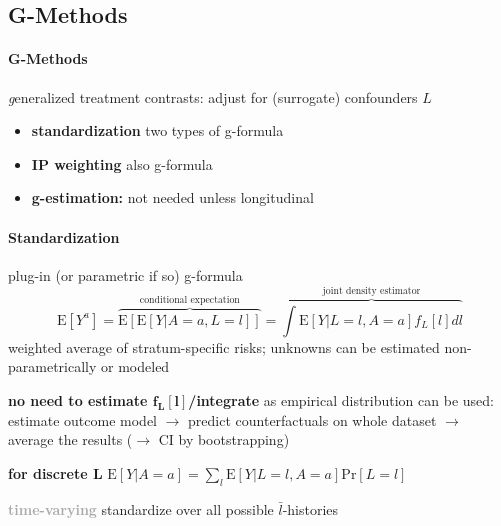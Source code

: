 \documentclass[8pt,oneside]{extarticle}
\begin{document}
\subsection{G-Methods}
\begin{multicols}{2}


\paragraph{\large G-Methods} \textit{g}eneralized treatment contrasts:
adjust for (surrogate) confounders $L$




\begin{itemize}[itemsep=0em, topsep=0pt, partopsep=0pt,parsep=0pt]
\setlength{\itemsep}{0pt}%
\setlength{\parskip}{0pt}
\item \textbf{standardization} two types of g-formula
\item \textbf{IP weighting} also g-formula
\item \textbf{g-estimation:} not needed unless longitudinal
\end{itemize}

\paragraph{\large Standardization} plug-in (or parametric if so) g-formula
$$\mathrm{E}\left[Y^{a}\right] = \overbrace{\mathrm{E}\left[\mathrm{E}\left[Y|A{=}a,L{=}l\right]\right]}^{\text{conditional expectation}} =  \overbrace{ \textstyle{\int} \mathrm{E}\left[Y|L=l, A=a\right]f_L\left[l\right]dl}^{\text{joint density estimator}} $$
weighted average of stratum-specific risks; unknowns can be estimated non-parametrically or modeled

\noindent \textbf{no need to estimate $\boldsymbol{f_L\left[l\right]}$/integrate} as empirical distribution can be used: estimate outcome model $\rightarrow$ predict counterfactuals on whole dataset $\rightarrow$ average the results ($\rightarrow$ CI by bootstrapping)

\noindent \textbf{for discrete $\boldsymbol{ L}$}  $\mathrm{E}\left[Y|A=a\right] = \sum_l \mathrm{E}\left[Y|L=l, A=a\right]\mathrm{Pr}\left[L=l\right]$

\vspace{0.2em}
\noindent \colorbox{lightgray!20!white}{\begin{minipage}{28em}




\textbf{\textcolor{darkgray}{time-varying}} standardize over all possible $\bar{l}$-histories




\end{minipage}}
\end{multicols}
\end{document}
